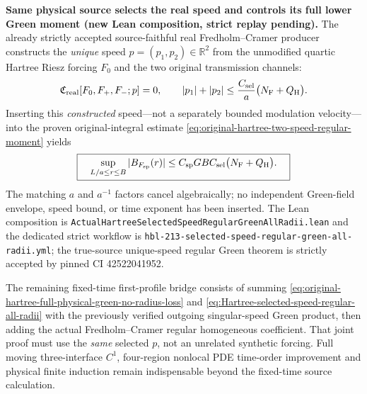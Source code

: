 \documentclass[11pt]{amsart}
\begin{document}
\medskip
\noindent\textbf{Same physical source selects the real speed and controls its
full lower Green moment (new Lean composition, strict replay pending).}
The already strictly accepted source-faithful real Fredholm--Cramer
producer constructs the \emph{unique} speed
$p=(p_1,p_2)\in\mathbb R^2$ from the unmodified quartic Hartree Riesz
forcing $F_0$ and the two original transmission channels:
\[
 \mathfrak C_{\mathrm{real}}[F_0,F_+,F_-;p]=0,\qquad
 |p_1|+|p_2|
 \le \frac{C_{\rm sel}}a\bigl(N_{\rm F}+Q_{\rm H}\bigr).
\]
Inserting this \emph{constructed} speed---not a separately bounded
modulation velocity---into the proven original-integral estimate
\eqref{eq:original-hartree-two-speed-regular-moment} yields
\begin{equation}
 \boxed{\quad
 \sup_{L/a\le r\le B}|B_{F_{\rm sp}}(r)|
 \le C_{\rm sp}GBC_{\rm sel}
       \bigl(N_{\rm F}+Q_{\rm H}\bigr).
 \quad}
 \label{eq:Hartree-selected-speed-regular-all-radii}
\end{equation}
The matching $a$ and $a^{-1}$ factors cancel algebraically; no
independent Green-field envelope, speed bound, or time exponent has been
inserted.  The Lean composition is
\texttt{ActualHartreeSelectedSpeedRegularGreenAllRadii.lean}
and the dedicated strict workflow is
\texttt{hbl-213-selected-speed-regular-green-all-radii.yml};
the true-source unique-speed regular Green theorem is strictly accepted by pinned CI 42522041952.

The remaining fixed-time first-profile bridge consists of summing
\eqref{eq:original-hartree-full-physical-green-no-radius-loss}
and \eqref{eq:Hartree-selected-speed-regular-all-radii} with the
previously verified outgoing singular-speed Green product, then adding
the actual Fredholm--Cramer regular homogeneous coefficient.  That
joint proof must use the \emph{same} selected $p$, not an unrelated
synthetic forcing.  Full moving three-interface $C^1$, four-region
nonlocal PDE time-order improvement and physical finite induction
remain indispensable beyond the fixed-time source calculation.
\end{document}
